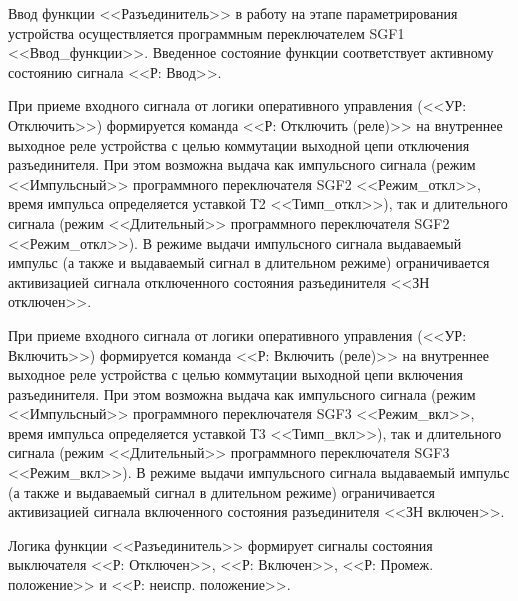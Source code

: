 
\begin{flushleft}
\color{black}
\nopagebreak
\end{flushleft}

\par
Ввод функции <<Разъединитель>> в работу на этапе параметрирования устройства осуществляется программным переключателем SGF1 <<Ввод\_функции>>. Введенное состояние функции соответствует активному состоянию сигнала <<Р: Ввод>>.

\par
При приеме входного сигнала от логики оперативного управления (<<УР: Отключить>>) формируется команда <<Р: Отключить (реле)>> на внутреннее выходное реле устройства с целью коммутации выходной цепи отключения разъединителя. При этом возможна выдача как импульсного сигнала (режим <<Импульсный>> программного переключателя SGF2 <<Режим\_откл>>, время импульса определяется уставкой Т2 <<Тимп\_откл>>), так и длительного сигнала (режим <<Длительный>> программного переключателя SGF2 <<Режим\_откл>>). 
В режиме выдачи импульсного сигнала выдаваемый импульс (а также и выдаваемый сигнал в длительном режиме) ограничивается активизацией сигнала отключенного состояния разъединителя <<ЗН отключен>>.

\par
При приеме входного сигнала от логики оперативного управления (<<УР: Включить>>) формируется команда <<Р: Включить (реле)>> на внутреннее выходное реле устройства с целью коммутации выходной цепи включения разъединителя. При этом возможна выдача как импульсного сигнала (режим <<Импульсный>> программного переключателя SGF3 <<Режим\_вкл>>, время импульса определяется уставкой Т3 <<Тимп\_вкл>>), так и длительного сигнала (режим <<Длительный>> программного переключателя SGF3 <<Режим\_вкл>>).
В режиме выдачи импульсного сигнала выдаваемый импульс (а также и выдаваемый сигнал в длительном режиме) ограничивается активизацией сигнала включенного состояния разъединителя <<ЗН включен>>.

\par
Логика функции <<Разъединитель>> формирует сигналы состояния выключателя <<Р: Отключен>>, <<Р: Включен>>, <<Р: Промеж. положение>> и <<Р: неиспр. положение>>.

